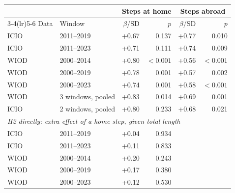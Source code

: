 \begin{tabular}{llrrrr}
\toprule
 & & \multicolumn{2}{c}{Steps at home} & \multicolumn{2}{c}{Steps abroad} \\
\cmidrule(lr){3-4}\cmidrule(lr){5-6}
Data & Window & $\beta$/SD & $p$ & $\beta$/SD & $p$ \\
\midrule
ICIO & 2011--2019 & +0.67 & 0.137 & +0.77 & 0.010 \\
ICIO & 2011--2023 & +0.71 & 0.111 & +0.74 & 0.009 \\
WIOD & 2000--2014 & +0.80 & $<0.001$ & +0.56 & $<0.001$ \\
WIOD & 2000--2019 & +0.78 & 0.001 & +0.57 & 0.002 \\
WIOD & 2000--2023 & +0.74 & 0.001 & +0.58 & $<0.001$ \\
WIOD & 3 windows, pooled & +0.83 & 0.014 & +0.69 & 0.001 \\
ICIO & 2 windows, pooled & +0.80 & 0.233 & +0.68 & 0.021 \\
\midrule
\multicolumn{6}{l}{\emph{H2 directly: extra effect of a home step, given total length}} \\
ICIO & 2011--2019 & +0.04 & 0.934 & & \\
ICIO & 2011--2023 & +0.11 & 0.833 & & \\
WIOD & 2000--2014 & +0.20 & 0.243 & & \\
WIOD & 2000--2019 & +0.17 & 0.380 & & \\
WIOD & 2000--2023 & +0.12 & 0.530 & & \\
\bottomrule
\end{tabular}
